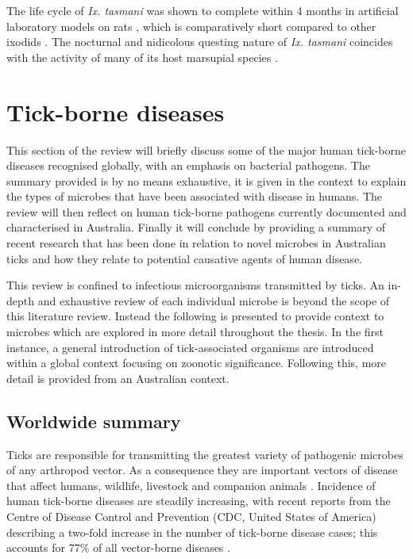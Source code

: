 \documentclass[a4paper, nobind]{templates/ociamthesis}
\begin{document}
The life cycle of \emph{Ix. tasmani} was shown to complete within 4 months in artificial laboratory models on rats \autocite{murdochEcologyCommonMarsupial2005}, which is comparatively short compared to other ixodids \autocite{oliverBiologySystematicsTicks1989}.
The nocturnal and nidicolous questing nature of \emph{Ix. tasmani} coincides with the activity of many of its host marsupial species \autocite{murdochEcologyCommonMarsupial2005}.

\hypertarget{tick-borne-diseases}{%
\section{Tick-borne diseases}\label{tick-borne-diseases}}

This section of the review will briefly discuss some of the major human tick-borne diseases recognised globally, with an emphasis on bacterial pathogens.
The summary provided is by no means exhaustive, it is given in the context to explain the types of microbes that have been associated with disease in humans.
The review will then reflect on human tick-borne pathogens currently documented and characterised in Australia.
Finally it will conclude by providing a summary of recent research that has been done in relation to novel microbes in Australian ticks and how they relate to potential causative agents of human disease.

This review is confined to infectious microorganisms transmitted by ticks. An in-depth and exhaustive review of each individual microbe is beyond the scope of this literature review. Instead the following is presented to provide context to microbes which are explored in more detail throughout the thesis.
In the first instance, a general introduction of tick-associated organisms are introduced within a global context focusing on zoonotic significance.
Following this, more detail is provided from an Australian context.

\hypertarget{worldwide-summary}{%
\subsection{Worldwide summary}\label{worldwide-summary}}

Ticks are responsible for transmitting the greatest variety of pathogenic microbes of any arthropod vector.
As a consequence they are important vectors of disease that affect humans, wildlife, livestock and companion animals \autocite{jongejanGlobalImportanceTicks2004}.
Incidence of human tick-borne diseases are steadily increasing, with recent reports from the Centre of Disease Control and Prevention (CDC, United States of America) describing a two-fold increase in the number of tick-borne disease cases; this accounts for 77\% of all vector-borne diseases \autocite{rosenbergVitalSignsTrends2018}.
\end{document}
